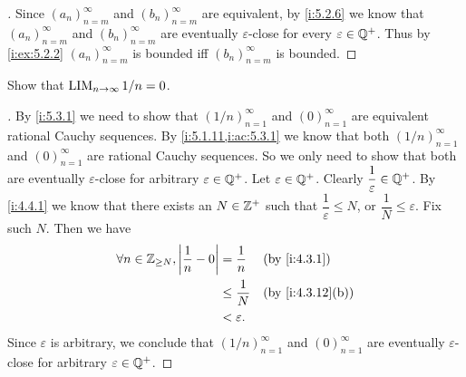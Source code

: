 \begin{proof}[]
  Since \((a_n)_{n = m}^{\infty}\) and \((b_n)_{n = m}^{\infty}\) are equivalent, by \cref{i:5.2.6} we know that \((a_n)_{n = m}^{\infty}\) and \((b_n)_{n = m}^{\infty}\) are eventually \(\varepsilon\)-close for every \(\varepsilon \in \mathbb{Q}^+\).
  Thus by \cref{i:ex:5.2.2} \((a_n)_{n = m}^{\infty}\) is bounded iff \((b_n)_{n = m}^{\infty}\) is bounded.
\end{proof}

\begin{ex}\label{i:ex:5.3.5}
  Show that \(\operatorname*{LIM}_{n \to \infty} 1 / n = 0\).
\end{ex}

\begin{proof}[]
  By \cref{i:5.3.1} we need to show that \((1 / n)_{n = 1}^\infty\) and \((0)_{n = 1}^\infty\) are equivalent rational Cauchy sequences.
  By \cref{i:5.1.11,i:ac:5.3.1} we know that both \((1/ n)_{n = 1}^{\infty}\) and \((0)_{n = 1}^\infty\) are rational Cauchy sequences.
  So we only need to show that both are eventually \(\varepsilon\)-close for arbitrary \(\varepsilon \in \mathbb{Q}^+\).
  Let \(\varepsilon \in \mathbb{Q}^+\).
  Clearly \(\dfrac{1}{\varepsilon} \in \mathbb{Q}^+\).
  By \cref{i:4.4.1} we know that there exists an \(N \in \mathbb{Z}^+\) such that \(\dfrac{1}{\varepsilon} \leq N\), or \(\dfrac{1}{N} \leq \varepsilon\).
  Fix such \(N\).
  Then we have
  \begin{align*}
    \forall n \in \Z_{\geq N}, \abs{\dfrac{1}{n} - 0} & = \dfrac{1}{n}    &  & \by{i:4.3.1}     \\
                                                      & \leq \dfrac{1}{N} &  & \by{i:4.3.12}[b] \\
                                                      & < \varepsilon.
  \end{align*}
  Since \(\varepsilon\) is arbitrary, we conclude that \((1 / n)_{n = 1}^\infty\) and \((0)_{n = 1}^\infty\) are eventually \(\varepsilon\)-close for arbitrary \(\varepsilon \in \mathbb{Q}^+\).
\end{proof}
